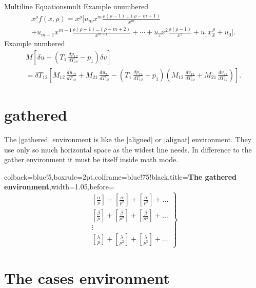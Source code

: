 \begin{texexample}{Multiline Equations}{mult}
Example unumbered
\begin{multline*}
x^{\rho}f(x, \rho) = x^{\rho} \Big [ u_{m}x^{m}\frac{\rho(\rho-1)\ldots (\rho-m+1)}{x^{m}} \\
                   + u_{m-1}x^{m-1}\frac{\rho(\rho-1)\ldots (\rho-m+2)}{x^{m-1}}+ \dotsb
                   + u_{2}x^{2}\frac{\rho(\rho-1)}{x^2}+u_{1}x\frac{\rho}{x}+u_0 \Big ].
\end{multline*}
Example  numbered
\begin{multline}
M \left[\delta u - \left(T_1\, \frac{dp_{12}}{dT_{12}} - p_1\right) \delta v\right] \\
= \delta T_{12} \left[M_{12}\, \frac{du_{12}}{dT_{12}} + M_{21}\, \frac{du_{21}}{dT_{12}}
  - \left(T_1\, \frac{dp_{12}}{dT_{12}} - p_1\right)
    \left(M_{12}\, \frac{dv_{12}}{dT_{12}}
        + M_{21}\, \frac{dv_{21}}{dT_{12}}\right)\right].
\end{multline}
\end{texexample}

\clearpage
\section{gathered}
The |gathered| environment is like the |aligned| or |alignat| environment. They use
only so much horizontal space as the widest line needs. In difference to the gather
environment it must be itself inside math mode.

\begin{tcblisting}{colback=blue!5,boxrule=2pt,colframe=blue!75!black,title=\textbf{The gathered environment},width=1.05\textwidth,before=\bigskip}
\[
  \left .
   \begin{gathered}
    \left [ \frac{\alpha}{p} \right ] +
    \left [ \frac{\alpha}{p^2} \right ] +
    \left [ \frac{\alpha}{p^3} \right ] +
    \ldots \\
    \left [ \frac{\beta}{p} \right ] +
    \left [ \frac{\beta}{p^2} \right ] +
    \left [ \frac{\beta}{p^3} \right ] +
    \ldots \\
      \vdots \\
    \left [ \frac{\lambda}{p} \right ] +
    \left [ \frac{\lambda}{p^2} \right ] +
    \left [ \frac{\lambda}{p^3} \right ] +
    \ldots
   \end{gathered}
  \right \} \tag{B}
\]
\end{tcblisting}

\section{The cases environment}

